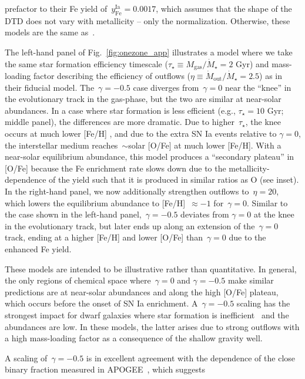 \documentclass[ms.tex]{subfiles}
\begin{document}
prefactor to their Fe yield of~$y_\text{Fe}^\text{Ia} = 0.0017$, which assumes
that the shape of the DTD does not vary with metallicity -- only the
normalization.
Otherwise, these models are the same as~\citet{Johnson2020}.
\par
The left-hand panel of Fig.~\ref{fig:onezone_app} illustrates a model where we
take the same star formation efficiency timescale
($\tau_\star \equiv M_\text{gas} / \dot{M}_\star = 2$ Gyr) and
mass-loading factor describing the efficiency of outflows
($\eta \equiv \dot{M}_\text{out} / \dot{M}_\star = 2.5$) as in their fiducial
model.
The~$\gamma = -0.5$ case diverges from~$\gamma = 0$ near the ``knee''
in the evolutionary track in the gas-phase, but the two are similar at
near-solar abundances.
In a case where star formation is less efficient (e.g., $\tau_\star = 10$ Gyr;
middle panel), the differences are more dramatic.
Due to higher~$\tau_\star$, the knee occurs at much lower [Fe/H]
\citep{Weinberg2017}, and due to the extra SN Ia events relative to
$\gamma = 0$, the interstellar medium reaches~$\sim$solar [O/Fe] at much lower
[Fe/H].
With a near-solar equilibrium abundance, this model produces a ``secondary
plateau'' in [O/Fe] because the Fe enrichment rate slows down due to the
metallicity-dependence of the yield such that it is produced in similar ratios
as O (see inset).
In the right-hand panel, we now additionally strengthen outflows to~$\eta = 20$,
which lowers the equilibrium abundance to [Fe/H]~$\approx -1$ for~$\gamma = 0$.
Similar to the case shown in the left-hand panel,~$\gamma = -0.5$ deviates from
$\gamma = 0$ at the knee in the evolutionary track, but later ends up along an
extension of the~$\gamma = 0$ track, ending at a higher [Fe/H] and lower [O/Fe]
than~$\gamma = 0$ due to the enhanced Fe yield.
\par
These models are intended to be illustrative rather than quantitative.
In general, the only regions of chemical space where~$\gamma = 0$ and
$\gamma = -0.5$ make similar predictions are at near-solar abundances and along
the high [O/Fe] plateau, which occurs before the onset of SN Ia enrichment.
A~$\gamma = -0.5$ scaling has the strongest impact for dwarf galaxies where
star formation is inefficient~\citep[e.g.][]{Hudson2015} and the abundances are
low.
In these models, the latter arises due to strong outflows with a high
mass-loading factor as a consequence of the shallow gravity well.
\par
A scaling of~$\gamma = -0.5$ is in excellent agreement with the dependence of
the close binary fraction measured in APOGEE~\citep{Moe2019}, which suggests
\end{document}
